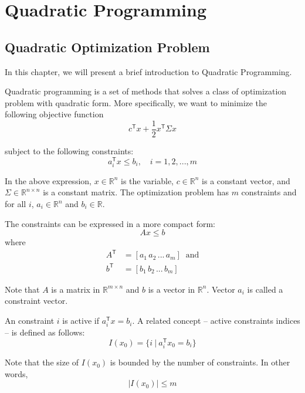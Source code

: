 \documentclass[letterpaper, oneside]{book}
\theoremstyle{definition}
\theoremstyle{remark}
\begin{document}
\chapter{Quadratic Programming}

\section{Quadratic Optimization Problem}

In this chapter, we will present a brief introduction to Quadratic Programming.

Quadratic programming is a set of methods that solves a class of optimization problem with quadratic form. More specifically, we want to minimize the following objective function
\begin{displaymath}
	c^{\mathsf{T}}x + \frac{1}{2}x^{\mathsf{T}} \Sigma x
\end{displaymath}

subject to the following constraints:
\begin{displaymath}
	a_i^{\mathsf{T}}x \leqslant b_i, \quad i=1,2,...,m
\end{displaymath}

In the above expression, $x \in \mathbb{R}^n$ is the variable, $c \in \mathbb{R}^n$ is a constant vector, and $\Sigma \in \mathbb{R}^{n\times n}$ is a constant matrix. The optimization problem has $m$ constraints and for all $i$, $a_i \in \mathbb{R}^n$ and $b_i \in \mathbb{R}$.

The constraints can be expressed in a more compact form:
\begin{displaymath}
	Ax \leqslant b
\end{displaymath}
where 
\begin{align*}
	A^{\mathsf{T}} & = [a_1 \, a_2 \, ... \, a_m] \;\; \textrm{and} \\
	b^{\mathsf{T}} & = [b_1 \, b_2 \, ... \, b_m]
\end{align*}

Note that  $A$ is a matrix in $\mathbb{R}^{m \times n}$ and $b$ is a vector in $\mathbb{R}^n$. Vector $a_i$ is called a constraint vector.

An constraint $i$ is active if $a_i^{\mathsf{T}}x = b_i$. A related concept -- active constraints indices -- is defined as follows:
\[
	I(x_0) = \{i \ | \ a_i^{\mathsf{T}}x_0=b_i\}
\]

Note that the size of $I(x_0)$ is bounded by the number of constraints. In other words,
\[
	|I(x_0)| \leqslant m
\]
\end{document}

